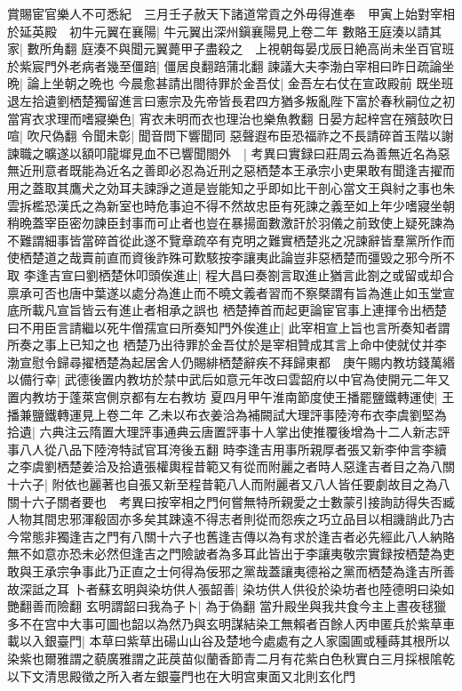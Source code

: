 賞賜宦官樂人不可悉紀　三月壬子赦天下諸道常貢之外毋得進奉　甲寅上始對宰相於延英殿　初牛元翼在襄陽|{
	牛元翼出深州鎭襄陽見上卷二年}
數賂王庭湊以請其家|{
	數所角翻}
庭湊不與聞元翼薨甲子盡殺之　上視朝每晏戊辰日絶高尚未坐百官班於紫宸門外老病者幾至僵踣|{
	僵居良翻踣蒲北翻}
諫議大夫李渤白宰相曰昨日疏論坐晩|{
	論上坐朝之晩也}
今晨愈甚請出閤待罪於金吾仗|{
	金吾左右仗在宣政殿前}
既坐班退左拾遺劉栖楚獨留進言曰憲宗及先帝皆長君四方猶多叛亂陛下富於春秋嗣位之初當宵衣求理而嗜寢樂色|{
	宵衣未明而衣也理治也樂魚教翻}
日晏方起梓宫在殯鼓吹日喧|{
	吹尺偽翻}
令聞未彰|{
	聞音問下響聞同}
惡聲遐布臣恐福祚之不長請碎首玉階以謝諫職之曠遂以額叩龍墀見血不已響聞閤外　|{
	考異曰實録曰莊周云為善無近名為惡無近刑意者既能為近名之善即必忍為近刑之惡栖楚本王承宗小吏果敢有聞逢吉擢而用之蓋取其鷹犬之効耳夫諫諍之道是豈能知之乎即如比干剖心當文王與紂之事也朱雲拆檻恐漢氏之為新室也時危事迫不得不然故忠臣有死諫之義至如上年少嗜寢坐朝稍晩蓋宰臣密勿諫臣封事而可止者也豈在暴揚面數激訐於羽儀之前致使上疑死諫為不難謂細事皆當碎首從此遂不覽章疏卒有克明之難實栖楚兆之况諫辭皆羣黨所作而使栖楚道之哉賣前直而資後詐殊可歎駭按李讓夷此論豈非惡栖楚而彊毁之邪今所不取}
李逢吉宣曰劉栖楚休叩頭俟進止|{
	程大昌曰奏劄言取進止猶言此劄之或留或却合禀承可否也唐中葉遂以處分為進止而不曉文義者習而不察槩謂有旨為進止如玉堂宣底所載凡宣旨皆云有進止者相承之誤也}
栖楚捧首而起更論宦官事上連揮令出栖楚曰不用臣言請繼以死牛僧孺宣曰所奏知門外俟進止|{
	此宰相宣上旨也言所奏知者謂所奏之事上已知之也}
栖楚乃出待罪於金吾仗於是宰相贊成其言上命中使就仗并李渤宣慰令歸尋擢栖楚為起居舍人仍賜緋栖楚辭疾不拜歸東都　庚午賜内教坊錢萬緡以備行幸|{
	武德後置内教坊於禁中武后如意元年改曰雲韶府以中官為使開元二年又置内教坊于蓬萊宫側京都有左右教坊}
夏四月甲午淮南節度使王播罷鹽鐵轉運使|{
	王播兼鹽鐵轉運見上卷二年}
乙未以布衣姜洽為補闕試大理評事陸洿布衣李虞劉堅為拾遺|{
	六典注云隋置大理評事通典云唐置評事十人掌出使推覆後增為十二人新志評事八人從八品下陸洿特試官耳洿後五翻}
時李逢吉用事所親厚者張又新李仲言李續之李虞劉栖楚姜洽及拾遺張權輿程昔範又有從而附麗之者時人惡逢吉者目之為八關十六子|{
	附依也麗著也自張又新至程昔範八人而附麗者又八人皆任要劇故目之為八關十六子關者要也　考異曰按宰相之門何嘗無特所親愛之士數蒙引接詢訪得失否臧人物其間忠邪渾殽固亦多矣其踈遠不得志者則從而怨疾之巧立品目以相譏誚此乃古今常態非獨逢吉之門有八關十六子也舊逢吉傳以為有求於逢吉者必先經此八人納賂無不如意亦恐未必然但逢吉之門險詖者為多耳此皆出于李讓夷敬宗實録按栖楚為吏敢與王承宗争事此乃正直之士何得為佞邪之黨哉蓋讓夷德裕之黨而栖楚為逢吉所善故深詆之耳}
卜者蘇玄明與染坊供人張韶善|{
	染坊供人供役於染坊者也陸德明曰染如艷翻善而險翻}
玄明謂韶曰我為子卜|{
	為于偽翻}
當升殿坐與我共食今主上晝夜毬獵多不在宫中大事可圖也韶以為然乃與玄明謀結染工無賴者百餘人丙申匿兵於紫草車載以入銀臺門|{
	本草曰紫草出碭山山谷及楚地今處處有之人家園圃或種蒔其根所以染紫也爾雅謂之藐廣雅謂之茈䓞苗似蘭香節青二月有花紫白色秋實白三月採根隂乾以下文清思殿徵之所入者左銀臺門也在大明宫東面又北則玄化門}
